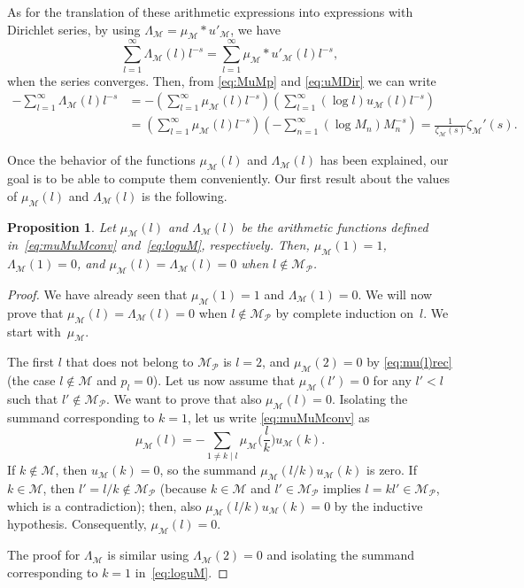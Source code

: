 \documentclass[11pt, a4paper]{article}
\newcommand{\calM}{\mathcal{M}}
\newcommand{\manM}{\Lambda_{\calM}}
\newcommand{\uM}{u_\calM}
\newcommand{\muM}{\mu_\calM}
\newcommand{\Mp}{\calM_{\mathcal{P}}}
\theoremstyle{plain}
\newtheorem{proposition}[theorem]{Proposition}
\theoremstyle{definition}
\begin{document}
As for the translation of these arithmetic expressions into expressions with Dirichlet series, 
by using $\manM = \muM * u'_\calM$, we have
\[
  \sum_{l=1}^{\infty} \manM(l)l^{-s} = \sum_{l=1}^{\infty} \muM * u'_\calM (l)l^{-s},
\]
when the series converges.
Then, from \eqref{eq:MuMp} and \eqref{eq:uMDir} we can write
\begin{align*}
  -\sum_{l=1}^{\infty} \manM(l)l^{-s} 
  &= - \left( \sum_{l=1}^\infty \muM(l) l^{-s} \right)
  \left( \sum_{l=1}^\infty (\log l) \uM(l) l^{-s} \right) \\
  &= \left( \sum_{l=1}^\infty \muM(l) l^{-s} \right)
  \left( {-}\sum_{n=1}^\infty (\log M_n) M_n^{-s} \right) 
  = \frac{1}{\zeta_{\calM}(s)} \zeta_{\calM}'(s).
\end{align*}

Once the behavior of the functions $\muM(l)$ and $\manM(l)$ has been explained, our goal is to be able to compute them conveniently. Our first result about the values of $\muM(l)$ and $\manM(l)$ is the following.

\begin{proposition}
\label{prop:fun(l)=0}
Let $\muM(l)$ and $\manM(l)$ be the arithmetic functions defined in~\eqref{eq:muMuMconv} and~\eqref{eq:loguM}, respectively. Then, 
$\muM(1) = 1$, $\manM(1) = 0$,
and $\muM(l)= \manM(l) = 0$ when $l \notin \Mp$.
\end{proposition}

\begin{proof} 
We have already seen that $\muM(1) = 1$ and $\manM(1) = 0$.
We will now prove that $\muM(l) = \manM(l) = 0$ when $l \notin \Mp$ by complete induction on~$l$.
We start with~$\muM$. 

The first $l$ that does not belong to $\Mp$ is $l=2$, and $\muM(2)=0$ by \eqref{eq:mu(l)rec} (the case $l \notin \calM$ and $p_l=0$). 
Let us now assume that $\muM(l') = 0$ for any $l'<l$ such that  $l' \notin \Mp$. We want to prove that also $\muM(l) = 0$.
Isolating the summand corresponding to $k=1$, let us write \eqref{eq:muMuMconv} as
\[
  \muM(l) = - \sum_{1 \ne k \mid l} \muM\Big(\frac{l}{k}\Big)\uM(k).
\]
If $k \notin \calM$, then $\uM(k) = 0$, so the summand $\muM({l}/{k})\uM(k)$ is zero.
If $k \in \calM$, then $l' = l/k \notin \Mp$ (because $k \in \calM$ and $l' \in \Mp$ implies $l = kl' \in \Mp$, which is a contradiction); then, also $\muM({l}/{k})\uM(k) = 0$ by the inductive hypothesis. Consequently, $\muM(l)=0$.

The proof for $\manM$ is similar using $\manM(2)=0$ and isolating the summand corresponding to $k=1$ in~\eqref{eq:loguM}.
\end{proof}
\end{document}
